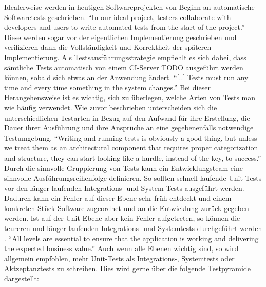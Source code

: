 Idealerweise werden in heutigen Softwareprojekten von Beginn an automatische Softwaretests geschrieben. "`In our ideal project, testers collaborate with developers and users to write automated tests from the start of the project."' \citep[S.][S. 83]{HumFar10} Diese werden sogar vor der eigentlichen Implementierung geschrieben und verifizieren dann die Vollständigkeit und Korrektheit der späteren Implementierung. Als Testsausführungsstrategie empfiehlt es sich dabei, dass sämtliche Tests automatisch von einem CI-Server TODO ausgeführt werden können, sobald sich etwas an der Anwendung ändert. \citep[Vgl.][S. 83]{HumFar10} "`[..] Tests must run any time and every time something in the system changes."' \citep[S.][S. 131]{DuvMatAnd07} Bei dieser Herangehensweise ist es wichtig, sich zu überlegen, welche Arten von Tests man wie häufig verwendet. Wie zuvor beschrieben unterscheiden sich die unterschiedlichen Testarten in Bezug auf den Aufwand für ihre Erstellung, die Dauer ihrer Ausführung und ihre Ansprüche an eine gegebenenfalls notwendige Testumgebung. "`Writing and running tests is obviously a good thing, but unless we treat them as an architectural component that requires proper categorization and structure, they can start looking like a hurdle, instead of the key, to success."' \citep[S.][S. 138]{DuvMatAnd07} Durch die sinnvolle Gruppierung von Tests kann ein Entwicklungsteam eine sinnvolle Ausführungsreihenfolge definieren. So sollten schnell laufende Unit-Tests vor den länger laufenden Integrations- und System-Tests ausgeführt werden. Dadurch kann ein Fehler auf dieser Ebene sehr früh entdeckt und einem konkreten Stück Software zugeordnet und an die Entwicklung zurück gegeben werden. Ist auf der Unit-Ebene aber kein Fehler aufgetreten, so können die teureren und länger laufenden Integrations- und Systemtests durchgeführt werden \citep[Vgl.][S. 138]{DuvMatAnd07}. "`All levels are essential to ensure that the application is working and delivering the expected business value."' \citep[S.][S. 178]{HumFar10} Auch wenn alle Ebenen wichtig sind, so wird allgemein empfohlen, mehr Unit-Tests als Integrations-, Systemtests oder Aktzeptanztests zu schreiben. Dies wird gerne über die folgende Testpyramide dargestellt:

